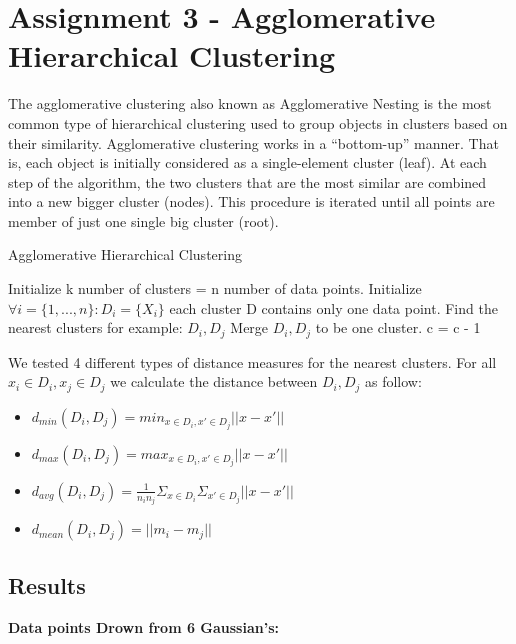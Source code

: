 \documentclass[12pt, a4paper]{paper}
\begin{document}
\section*{Assignment 3 - Agglomerative Hierarchical Clustering}
The agglomerative clustering also known as Agglomerative Nesting is the most common type of hierarchical clustering used to group objects in clusters based on their similarity. Agglomerative clustering works in a “bottom-up” manner. That is, each object is initially considered as a single-element cluster (leaf). At each step of the algorithm, the two clusters that are the most similar are combined into a new bigger cluster (nodes). This procedure is iterated until all points are member of just one single big cluster (root). \\

\begin{algorithm}
{\fontsize{10pt}{10pt}\selectfont
\caption{Agglomerative Hierarchical Clustering}\label{alg:BrothForce}
\begin{algorithmic}[1]
\State Initialize k number of clusters = n number of data points.
\State Initialize $\forall i = \{1,...,n\} : D_{i} = \{X_{i}\} $ each cluster D contains only one data point. 
\State Find the nearest clusters for example: $D_{i}, D_{j}$ 
\State Merge $D_{i}, D_{j}$ to be one cluster.
\State c = c - 1 
\EndWhile 
\end{algorithmic}
}
\end{algorithm}  

We tested 4 different types of distance measures for the nearest clusters.
For all $x_{i} \in D_{i}, x_{j} \in D_{j}$ we calculate the distance between $D_{i}, D_{j}$ as follow: 
\begin{itemize}
    \item $d_{min}(D_{i}, D_{j}) = min_{x \in D_{i}, x' \in D_{j}} ||x-x'||$
    \item $d_{max}(D_{i}, D_{j}) = max_{x \in D_{i}, x' \in D_{j}} ||x-x'||$
    \item $d_{avg}(D_{i}, D_{j}) = \frac{1}{n_{i}n_{j}} \Sigma_{x \in D_{i}} \Sigma_{x' \in D_{j}} ||x-x'||$
    \item $d_{mean}(D_{i}, D_{j}) = ||m_{i}-m_{j}||$
\end{itemize}

\subsection*{Results}
\textbf{Data points Drown from 6 Gaussian's:}
\end{document}
